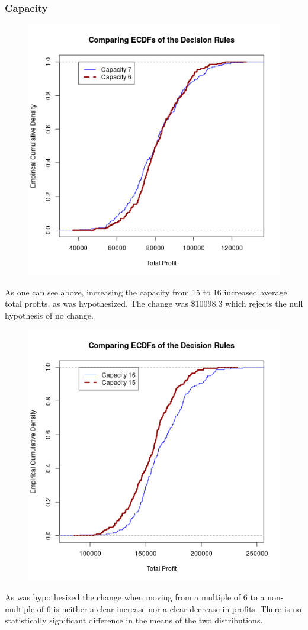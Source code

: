 \documentclass{article}
\begin{document}
		\subsubsection*{Capacity}
		\begin{figure}[H]
		\centering
		\includegraphics[width=.5\textwidth]{capECDF.png}
		\end{figure}
		\indent\indent As one can see above, increasing the capacity from 15 to 16 increased average total profits, as was hypothesized. The change was \$10098.3 which rejects the null hypothesis of no change.
		\begin{figure}[H]
		\centering
		\includegraphics[width=.5\textwidth]{othcapECDF.png}
		\end{figure}
		\indent\indent As was hypothesized the change when moving from a multiple of 6 to a non-multiple of 6 is neither a clear increase nor a clear decrease in profits. There is no statistically significant difference in the means of the two distributions.
\end{document}
